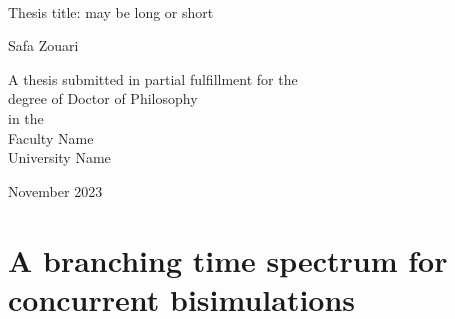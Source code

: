 \documentclass[11pt,a4paper,oldfontcommands]{memoir}
\begin{document}
%
%
\thispagestyle{empty}

{%
\sffamily
\centering
\Large

~\vspace{\fill}

{\huge 
Thesis title: may be long or short
}

\vspace{2.5cm}

{\LARGE
Safa Zouari
}

\vspace{3.5cm}

A thesis submitted in partial fulfillment for the\\
degree of Doctor of Philosophy\\[1em]
in the\\[1em]
Faculty Name\\
University Name

\vspace{3.5cm}


\vspace{\fill}

November 2023

}%

\cleardoublepage

\tableofcontents*

\clearpage


\chapter{A branching time spectrum for concurrent bisimulations}
\end{document}
